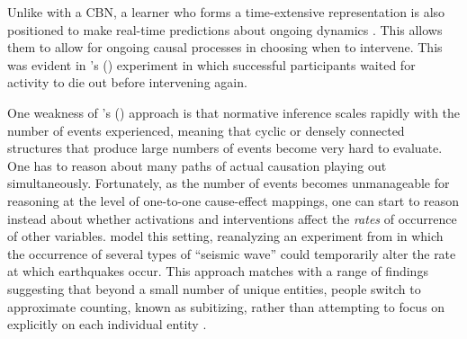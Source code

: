 \documentclass{cambridge7A}%
\def\citeapos#1{\citeauthor{#1}'s (\citeyear{#1})}
\begin{document}
Unlike with a CBN, a learner who forms a time-extensive representation is also positioned to make real-time predictions about ongoing dynamics \citep{clark2013whatever}.  This allows them to allow for ongoing causal processes in choosing when to intervene.   This was evident in \citeapos{bramley2017dynamic} experiment in which successful participants waited for activity to die out before intervening again.  %

One weakness of \citeapos{bramley2018time} approach is that normative inference scales rapidly with the number of events experienced, meaning that cyclic or densely connected structures that produce large numbers of events become very hard to evaluate.  One has to reason about many paths of actual causation playing out simultaneously.  Fortunately, as the number of events becomes unmanageable for reasoning at the level of one-to-one cause-effect mappings, one can start to reason instead about whether activations and interventions affect the \emph{rates} of occurrence of other variables.  \cite{pacer2015upsetting} model this setting, reanalyzing an experiment from \cite{lagnado2010influence} in which the occurrence of several types of ``seismic wave'' could temporarily alter the rate at which earthquakes occur.  This approach matches with a range of findings suggesting that beyond a small number of unique entities, people switch to approximate counting, known as subitizing, rather than attempting to focus on explicitly on each individual entity \citep{mandler1982subitizing}.
\end{document}
